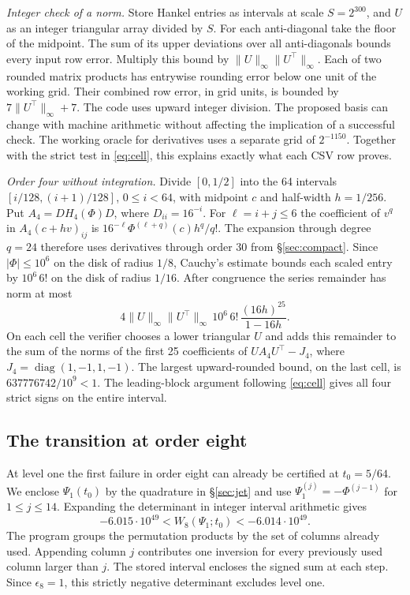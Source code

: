 \documentclass[11pt,a4paper,reqno]{amsart}
\numberwithin{equation}{section}
\begin{document}
\textit{Integer check of a norm.} Store Hankel entries as intervals at scale \(S=2^{300}\), and \(U\) as an integer triangular array divided by \(S\). For each anti-diagonal take the floor of the midpoint. The sum of its upper deviations over all anti-diagonals bounds every input row error. Multiply this bound by \(\|U\|_\infty\|U^\top\|_\infty\). Each of two rounded matrix products has entrywise rounding error below one unit of the working grid. Their combined row error, in grid units, is bounded by \(7\|U^\top\|_\infty+7\). The code uses upward integer division. The proposed basis can change with machine arithmetic without affecting the implication of a successful check. The working oracle for derivatives uses a separate grid of \(2^{-1150}\). Together with the strict test in \eqref{eq:cell}, this explains exactly what each CSV row proves.

\textit{Order four without integration.}
Divide \([0,1/2]\) into the 64 intervals \([i/128,(i+1)/128]\), \(0\le i<64\), with midpoint \(c\) and half-width \(h=1/256\). Put \(A_4=DH_4(\Phi)D\), where \(D_{ii}=16^{-i}\). For \(\ell=i+j\le6\) the coefficient of \(v^q\) in \(A_4(c+hv)_{ij}\) is \(16^{-\ell}\Phi^{(\ell+q)}(c)h^q/q!\). The expansion through degree \(q=24\) therefore uses derivatives through order 30 from \S\ref{sec:compact}. Since \(|\Phi|\le10^6\) on the disk of radius \(1/8\), Cauchy's estimate bounds each scaled entry by \(10^6\,6!\) on the disk of radius \(1/16\). After congruence the series remainder has norm at most
\[
4\|U\|_\infty\|U^\top\|_\infty\,10^6\,6!\,
\frac{(16h)^{25}}{1-16h}.
\]
On each cell the verifier chooses a lower triangular \(U\) and adds this remainder to the sum of the norms of the first 25 coefficients of \(UA_4U^\top-J_4\), where \(J_4=\operatorname{diag}(1,-1,1,-1)\). The largest upward-rounded bound, on the last cell, is \(637776742/10^9<1\). The leading-block argument following \eqref{eq:cell} gives all four strict signs on the entire interval.

\subsection{The transition at order eight}\label{sec:eight}

At level one the first failure in order eight can already be certified at \(t_0=5/64\). We enclose \(\Psi_1(t_0)\) by the quadrature in \S\ref{sec:jet} and use \(\Psi_1^{(j)}=-\Phi^{(j-1)}\) for \(1\le j\le14\). Expanding the determinant in integer interval arithmetic gives
\[
 -6.015\cdot10^{49}<W_8(\Psi_1;t_0)<-6.014\cdot10^{49}.
\]
The program groups the permutation products by the set of columns already used. Appending column \(j\) contributes one inversion for every previously used column larger than \(j\). The stored interval encloses the signed sum at each step. Since \(\epsilon_8=1\), this strictly negative determinant excludes level one.
\end{document}

